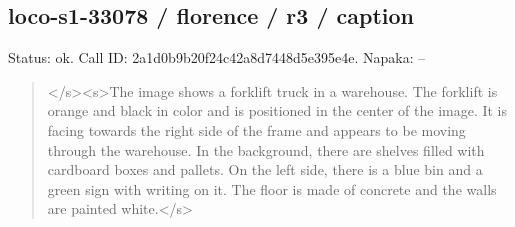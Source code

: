 \documentclass[10pt,a4paper]{article}
\begin{document}
\subsection*{loco-s1-33078 / florence / r3 / caption}
Status: ok. Call ID: 2a1d0b9b20f24c42a8d7448d5e395e4e. Napaka: --
\begin{quote}\footnotesize
</s>\allowbreak{}<s>\allowbreak{}The image shows a forklift truck in a warehouse. The forklift is orange and black in color and is positioned in the center of the image. It is facing towards the right side of the frame and appears to be moving through the warehouse. In the background,\allowbreak{} there are shelves filled with cardboard boxes and pallets. On the left side,\allowbreak{} there is a blue bin and a green sign with writing on it. The floor is made of concrete and the walls are painted white.</s>\allowbreak{}
\end{quote}
\end{document}
